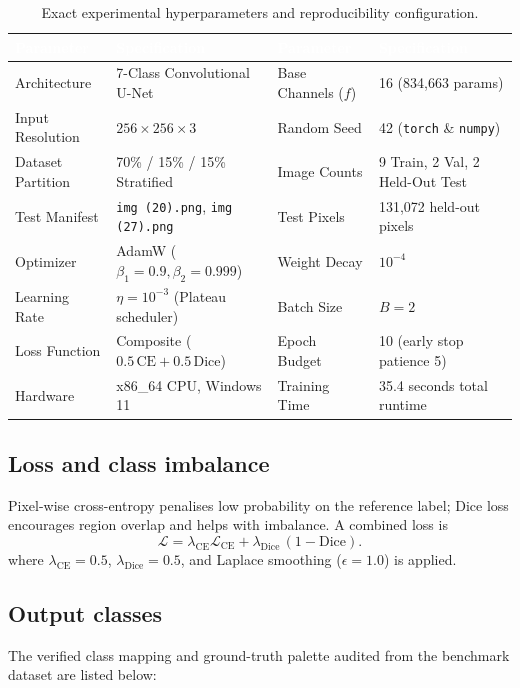 \documentclass[12pt,a4paper]{article}
\newcommand{\thead}[1]{\cellcolor{navy}\textcolor{white}{\textbf{#1}}}
\begin{document}
\begin{table}[H]\centering\small
\caption{Exact experimental hyperparameters and reproducibility configuration.}\label{tab:hyperparameters}
\begin{tabularx}{\linewidth}{l Y l Y}
\toprule
\thead{Parameter} & \thead{Specification} & \thead{Parameter} & \thead{Specification}\\
\midrule
Architecture & 7-Class Convolutional U-Net & Base Channels ($f$) & 16 (834,663 params)\\
Input Resolution & $256\times256\times3$ & Random Seed & 42 (\texttt{torch} \& \texttt{numpy})\\
Dataset Partition & 70\% / 15\% / 15\% Stratified & Image Counts & 9 Train, 2 Val, 2 Held-Out Test\\
Test Manifest & \texttt{img (20).png}, \texttt{img (27).png} & Test Pixels & 131,072 held-out pixels\\
Optimizer & AdamW ($\beta_1=0.9, \beta_2=0.999$) & Weight Decay & $10^{-4}$\\
Learning Rate & $\eta=10^{-3}$ (Plateau scheduler) & Batch Size & $B=2$\\
Loss Function & Composite ($0.5\,\text{CE} + 0.5\,\text{Dice}$) & Epoch Budget & 10 (early stop patience 5)\\
Hardware & x86\_64 CPU, Windows 11 & Training Time & 35.4 seconds total runtime\\
\bottomrule
\end{tabularx}
\end{table}

\subsection{Loss and class imbalance}
Pixel-wise cross-entropy penalises low probability on the reference label; Dice loss encourages region overlap and helps with imbalance. A combined loss is
\begin{equation}
\mathcal{L}=\lambda_{\mathrm{CE}}\mathcal{L}_{\mathrm{CE}}+\lambda_{\mathrm{Dice}}\,(1-\mathrm{Dice}).
\end{equation}
where $\lambda_{\mathrm{CE}}=0.5$, $\lambda_{\mathrm{Dice}}=0.5$, and Laplace smoothing ($\epsilon=1.0$) is applied.

\subsection{Output classes}
The verified class mapping and ground-truth palette audited from the benchmark dataset are listed below:
\end{document}
